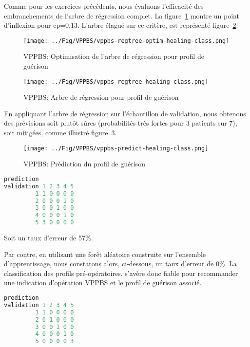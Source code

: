 %
%

%

Comme pour les exercices précédents, nous évaluons l'efficacité des embranchements de l'arbre de régression complet. La figure~\ref{fig-vppbs-regtree-optim-healing-class} montre un point d'inflexion pour cp=0,13. L'arbre élagué sur ce critère, est représenté figure~\ref{fig-vppbs-regtree-healing-class}.

\begin{figure}[H]
\centering
\texttt{[image: ../Fig/VPPBS/vppbs-regtree-optim-healing-class.png]}
\caption{VPPBS: Optimisation de l'arbre de régression pour profil de guérison}
\label{fig-vppbs-regtree-optim-healing-class}
\end{figure}

\begin{figure}[H]
\centering
\texttt{[image: ../Fig/VPPBS/vppbs-regtree-healing-class.png]}
\caption{VPPBS: Arbre de régression pour profil de guérison}
\label{fig-vppbs-regtree-healing-class}
\end{figure}

En appliquant l'arbre de régression sur l'échantillon de validation, nous obtenons des prévisions soit plutôt sûres (probabilités très fortes pour 3 patients sur 7), soit mitigées, comme illustré figure~\ref{fig-vppbs-predict-healing-class}.

\begin{figure}[H]
\centering
\texttt{[image: ../Fig/VPPBS/vppbs-predict-healing-class.png]}
\caption{VPPBS: Prédiction du profil de guérison}
\label{fig-vppbs-predict-healing-class}
\end{figure}

\begin{lstlisting}[language=R]
          prediction
validation 1 2 3 4 5
         1 1 0 0 0 0
         2 0 0 0 1 0
         3 0 0 1 0 0
         4 0 0 0 1 0
         5 3 0 0 0 0
\end{lstlisting}
Soit un taux d'erreur de 57\%.

Par contre, en utilisant une forêt aléatoire construite sur l'ensemble d'apprentissage, nous constatons alors, ci-dessous, un taux d'erreur de 0\%. La classification des profils pré-opératoires, s'avère donc fiable pour recommander une indication d'opération VPPBS et le profil de guérison associé.

\begin{lstlisting}[language=R]
          prediction
validation 1 2 3 4 5
         1 1 0 0 0 0
         2 0 1 0 0 0
         3 0 0 1 0 0
         4 0 0 0 1 0
         5 0 0 0 0 3
\end{lstlisting}

